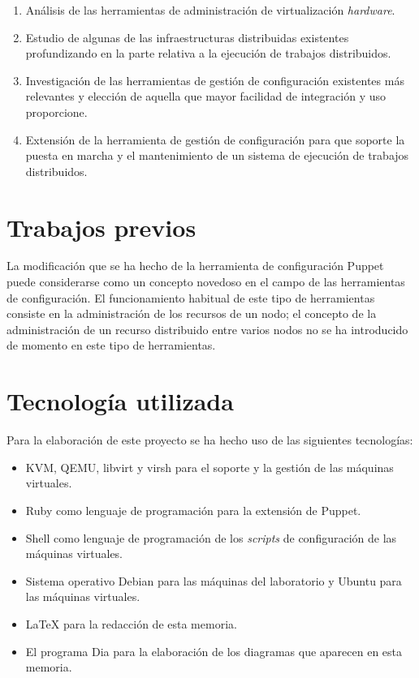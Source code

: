 \begin{enumerate}
\item Análisis de las herramientas de administración de virtualización \emph{hardware}.
\item Estudio de algunas de las infraestructuras distribuidas existentes profundizando en la parte relativa a la ejecución de trabajos distribuidos.
\item Investigación de las herramientas de gestión de configuración existentes más relevantes y elección de aquella que mayor facilidad de integración y uso proporcione.
\item Extensión de la herramienta de gestión de configuración para que soporte la puesta en marcha y el mantenimiento de un sistema de ejecución de trabajos distribuidos.
\end{enumerate}


\section{Trabajos previos}

La modificación que se ha hecho de la herramienta de configuración Puppet puede considerarse como un concepto novedoso en el campo de las herramientas de configuración. El funcionamiento habitual de este tipo de herramientas consiste en la administración de los recursos de un nodo; el concepto de la administración de un recurso distribuido entre varios nodos no se ha introducido de momento en este tipo de herramientas.


\section{Tecnología utilizada}

Para la elaboración de este proyecto se ha hecho uso de las siguientes tecnologías:
\begin{itemize}
\item KVM, QEMU, libvirt y virsh para el soporte y la gestión de las máquinas virtuales.
\item Ruby como lenguaje de programación para la extensión de Puppet.
\item Shell como lenguaje de programación de los \emph{scripts} de configuración de las máquinas virtuales.
\item Sistema operativo Debian para las máquinas del laboratorio y Ubuntu para las máquinas virtuales.
\item \LaTeX{} \cite{manual:latex} para la redacción de esta memoria.
\item El programa Dia para la elaboración de los diagramas que aparecen en esta memoria.
\end{itemize}


